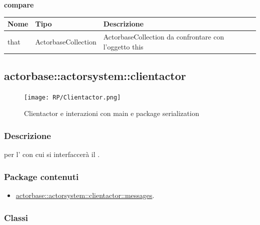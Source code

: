 \documentclass{scalatekids-article}
\begin{document}
\begin{center}
  \textbf{compare}\\
\end{center}
\begin{tabular}{| l | l | l |}
  \hline
  Nome & Tipo & Descrizione\\
  \hline
  that & ActorbaseCollection & ActorbaseCollection da confrontare con l'oggetto this \\
  \hline
\end{tabular}



\subsection{actorbase::actorsystem::clientactor}
\label{sec:actorbase::actorsystem::clientactor}

\begin{figure}[H]
  \begin{center}
    \texttt{[image: RP/Clientactor.png]}
    \caption{Clientactor e interazioni con main e package serialization}
  \end{center}
\end{figure}

\subsubsection{Descrizione}

 per l' con cui si interfaccerà il .

\subsubsection{Package contenuti}

\begin{itemize}
\item \hyperref[sec:actorbase::actorsystem::clientactor::messages]{actorbase::actorsystem::clientactor::messages}.
\end{itemize}

\subsubsection{Classi}
\end{document}
